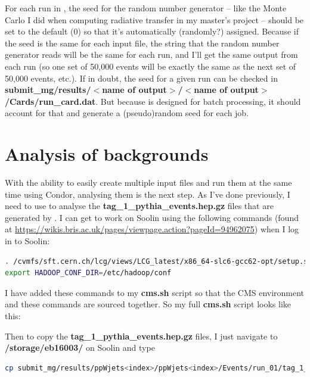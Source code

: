 For each run in \madgraph, the seed for the random number generator -- like the Monte Carlo I did when computing radiative transfer in my master's project -- should be set to the default (0) so that it's automatically (randomly?) assigned. Because if the seed is the same for each input file, the string that the random number generator reads will be the same for each run, and I'll get the same output from each run (so one set of 50,000 events will be exactly the same as the next set of 50,000 events, etc.). If in doubt, the seed for a given run can be checked in \textbf{submit\_mg/results/$<$name of output$>$/$<$name of output$>$/Cards/run\_card.dat}. But because \madgraph is designed for batch processing, it should account for that and generate a (pseudo)random seed for each job.

\section{Analysis of backgrounds}

With the ability to easily create multiple input files and run them at the same time using Condor, analysing them is the next step. As I've done previously, I need to use \madanalysis to analyse the \textbf{tag\_1\_pythia\_events.hep.gz} files that are generated by \madgraph. I can get \madanalysis to work on Soolin using the following commands (found at \url{https://wikis.bris.ac.uk/pages/viewpage.action?pageId=94962075}) when I log in to Soolin:

\begin{lstlisting}[belowskip=-0.7cm, language=sh, numbers=none]
. /cvmfs/sft.cern.ch/lcg/views/LCG_latest/x86_64-slc6-gcc62-opt/setup.sh}
export HADOOP_CONF_DIR=/etc/hadoop/conf
\end{lstlisting}

I have added these commands to my \textbf{cms.sh} script so that the CMS environment and these commands are sourced together. So my full \textbf{cms.sh} script looks like this:



Then to copy the \textbf{tag\_1\_pythia\_events.hep.gz} files, I just navigate to \textbf{/storage/eb16003/} on Soolin and type

\begin{lstlisting}[belowskip=-0.7cm, language=sh, numbers=none]
cp submit_mg/results/ppWjets<index>/ppWjets<index>/Events/run_01/tag_1_pythia_events.hep.gz MadAnalysis/MA5_v1_4/Input/ppWjets<index>.hep.gz
\end{lstlisting}

